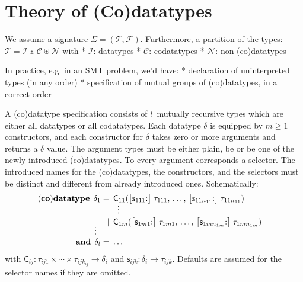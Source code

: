 \documentclass[a4paper,oribibl,envcountsame,draft]{llncs}
\newcommand\keyw[1]{\textbf{#1}}
\newcommand\const[1]{\textsf{#1}}
\begin{document}
\section{Theory of (Co)datatypes}
\label{sec:theory-of-co-datatypes}

We assume a signature $\Sigma = (\mathcal{T}, \mathcal{F})$.
Furthermore, a partition of the types:
  $\mathcal{T} = \mathcal{I} \uplus \mathcal{C} \uplus \mathcal{N}$
with
  * $\mathcal{I}$: datatypes
  * $\mathcal{C}$: codatatypes
  * $\mathcal{N}$: non-(co)datatypes















In practice, e.g. in an SMT problem, we'd have:
  * declaration of uninterpreted types (in any order)
  * specification of mutual groups of (co)datatypes, in a correct order


A (co)datatype specification consists of $l$~mutually recursive types which are
either all datatypes or all codatatypes. Each datatype $\delta$ is equipped by
$m \ge 1$ constructors, and each constructor for $\delta$ takes zero or more
arguments and returns a $\delta$ value. The argument types must be either
plain, be or be one of the newly introduced (co)datatypes. To every
argument corresponds a selector. The introduced names for the (co)datatypes, the
constructors, and the selectors must be distinct and different from already
introduced ones. Schematically:
%
\[
\begin{aligned}[t]
(\keyw{co})\keyw{datatype}\;\,
  \delta_1 & {}=\, \const{C}_{11}(\bigl[\const{s}_{111}{:}\bigr]\; \tau_{111}, \,\ldots,\, \bigl[\const{s}_{11n_{11}}{:}\bigr]\; \tau_{11n_{11}}) & \\
           & {}\;\phantom{=\,}\;{} \smash{\,\,\,\vdots} \\[-\jot] %
           & {}\;\phantom{=\,}\llap{\ensuremath{\,\mid\,}}\; \const{C}_{1m}(\bigl[\const{s}_{1m1}{:}\bigr]\; \tau_{1m1}, \,\ldots,\, \big[\const{s}_{1mn_{1m}}{:}\big]\; \tau_{1mn_{1m}}) \\[-1\jot]
   \smash{\vdots\,\,\,} \\[-1\jot]
  \keyw{and}\; \,\delta_l & =\, \ldots
\end{aligned}
\]
%
with
$\const{C}_{ij} : \tau_{ij1}\times\cdots\times\tau_{ijk_{ij}} \to \delta_i$
and $\const{s}_{ijk} : \delta_i \to \tau_{ijk}$. Defaults are assumed for
the selector names if they are omitted.
\end{document}
